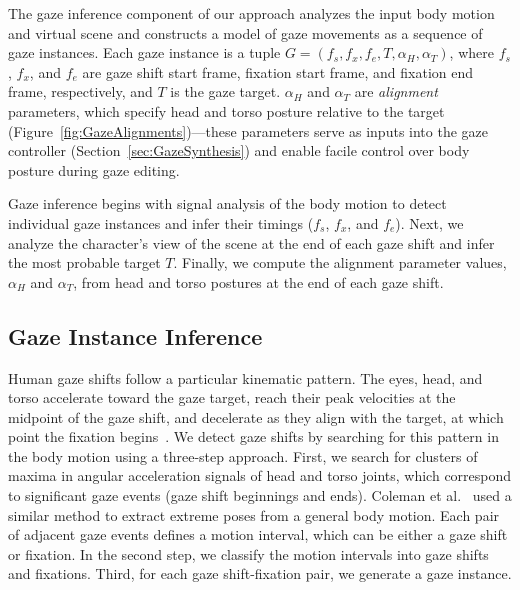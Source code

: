 The gaze inference component of our approach analyzes the input body motion and virtual scene and constructs a model of gaze movements as a sequence of gaze instances. Each gaze instance is a tuple $G = (f_s, f_x, f_e, T, \alpha_{H}, \alpha_{T})$, where $f_s$, $f_x$, and $f_e$ are gaze shift start frame, fixation start frame, and fixation end frame, respectively, and $T$ is the gaze target. $\alpha_{H}$ and $\alpha_{T}$ are \emph{alignment} parameters, which specify head and torso posture relative to the target (Figure~\ref{fig:GazeAlignments})---these parameters serve as inputs into the gaze controller (Section~\ref{sec:GazeSynthesis}) and enable facile control over body posture during gaze editing.

Gaze inference begins with signal analysis of the body motion to detect individual gaze instances and infer their timings ($f_s$, $f_x$, and $f_e$). Next, we analyze the character's view of the scene at the end of each gaze shift and infer the most probable target $T$. Finally, we compute the alignment parameter values, $\alpha_{H}$ and $\alpha_{T}$, from head and torso postures at the end of each gaze shift.

\subsection{Gaze Instance Inference}
\label{sec:GazeTimingInference}

Human gaze shifts follow a particular kinematic pattern. The eyes, head, and torso accelerate toward the gaze target, reach their peak velocities at the midpoint of the gaze shift, and decelerate as they align with the target, at which point the fixation begins~\cite{uemura1980eyehead,fuller1992head,mccluskey2007monkeys}. We detect gaze shifts by searching for this pattern in the body motion using a three-step approach. First, we search for clusters of maxima in angular acceleration signals of head and torso joints, which correspond to significant gaze events (gaze shift beginnings and ends). Coleman et al.~ used a similar method to extract extreme poses from a general body motion. Each pair of adjacent gaze events defines a motion interval, which can be either a gaze shift or fixation. In the second step, we classify the motion intervals into gaze shifts and fixations. Third, for each gaze shift-fixation pair, we generate a gaze instance.

